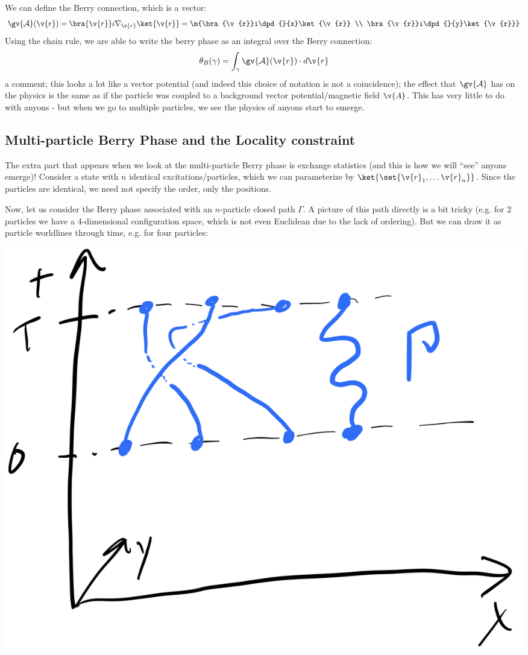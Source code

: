 We can define the Berry connection, which is a vector:
\begin{equation}
    \gv{\mathcal{A}}(\v{r}) = \bra{\v{r}}i\nabla_\v{r}\ket{\v{r}} = \m{\bra{\v{r}}i\dpd{}{x}\ket{\v{r}} \\ \bra{\v{r}}i\dpd{}{y}\ket{\v{r}}}
\end{equation}
Using the chain rule, we are able to write the berry phase as an integral over the Berry connection:
\begin{equation}
    \theta_B(\gamma) = \int_\gamma\gv{\mathcal{A}}(\v{r})\cdot d\v{r}
\end{equation}
a comment; this looks a lot like a vector potential (and indeed this choice of notation is not a coincidence); the effect that $\gv{\mathcal{A}}$ has on the physics is the same as if the particle was coupled to a background vector potential/magnetic field $\v{A}$. This has very little to do with anyons - but when we go to multiple particles, we see the physics of anyons start to emerge.

\subsection{Multi-particle Berry Phase and the Locality constraint}
The extra part that appears when we look at the multi-particle Berry phase is exchange statistics (and this is how we will ``see'' anyons emerge)! Consider a state with $n$ identical excitations/particles, which we can parameterize by $\ket{\set{\v{r}_1, \ldots \v{r}_n}}$. Since the particles are identical, we need not specify the order, only the positions.

Now, let us consider the Berry phase associated with an $n$-particle closed path $\Gamma$. A picture of this path directly is a bit tricky (e.g. for 2 particles we have a 4-dimensional configuration space, which is not even Euclidean due to the lack of ordering). But we can draw it as particle worldlines through time, e.g. for four particles:

\begin{center}
    \includegraphics[scale=0.3]{Lectures/Images/lec4-worldlines.png}
\end{center}

